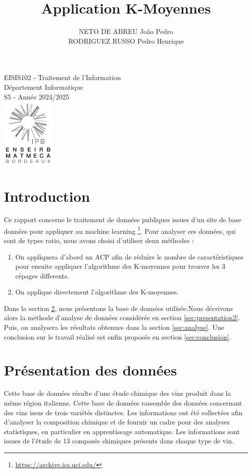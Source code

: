 \documentclass[a4paper,12pt]{article}
\title{Application K-Moyennes}
\author{NETO DE ABREU Jo\~ao Pedro \\ RODRIGUEZ RUSSO Pedro Henrique}
\date{}
\begin{document}
\maketitle

\begin{center}
  \large
  EISIS102 - Traitement de l'Information \\
  Département Informatique\\
  S5 - Année 2024/2025\\
  \vfill
  \includegraphics[width=0.2\textwidth]{enseirb-matmeca.png}
\end{center}

\newpage

\tableofcontents

\newpage

\section{Introduction}
Ce rapport concerne le traitement de données publiques issues d'un site de base données pour appliquer au machine learning \footnote{\url{https://archive.ics.uci.edu/}}. Pour analyser ces données, qui sont de types ratio, nous avons choisi d'utiliser deux méthodes :\\
\begin{enumerate}
\item On appliquera d'abord un ACP afin de réduire le nombre de caractéristiques pour ensuite appliquer l'algorithme des K-moyennes pour trouver les 3 cépages differents.\\
\item On applique directement l'algorithme des K-moyennes.
\end{enumerate}
\vspace{1cm}
Dans la section \ref{sec:presentation1}, nous présentons la base de données utilisée.Nous décrivons alors la méthode d'analyse de données considérée en section \ref{sec:presentation2}. Puis, on analysera les résultats obtenues dans la section \ref{sec:analyse}. Une conclusion sur le travail réalisé est enfin proposée en section \ref{sec:conclusion}.

\section{Présentation des données}
\label{sec:presentation1}
Cette base de données résulte d'une étude chimique des vins produit dans la même région italienne. Cette base de données rassemble des données concernant des vins issus de trois variétés distinctes. Les informations ont été collectées afin d'analyser la composition chimique et de fournir un cadre pour des analyses statistiques, en particulier en apprentissage automatique. Les informations sont issues de l'étude de 13 composés chimiques présents dans chaque type de vin.
\end{document}
